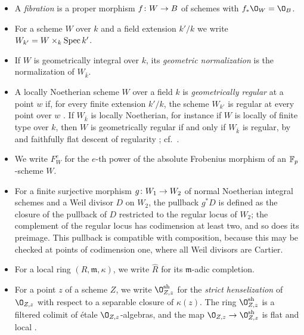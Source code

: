 \begin{itemize}
\item A \emph{fibration} is a proper morphism $f\colon W\to B$ of schemes with $f_*\O_W = \O_B$.
\item For a scheme $W$ over $k$ and a field extension $k'/k$ we write $W_{k'} = W\times_k\operatorname{Spec} k'$.
\item If $W$ is geometrically integral over $k$, its \emph{geometric normalization} is the normalization of $W_{\bar k}$.
\item A locally Noetherian scheme $W$ over a field $k$ is \emph{geometrically regular} at a point $w$ if, for every finite extension $k'/k$, the scheme $W_{k'}$ is regular at every point over $w$ \cite[D\'efinition~6.7.6]{EGA}.
  If $W_{\bar k}$ is locally Noetherian, for instance if $W$ is locally of finite type over $k$, then $W$ is geometrically regular if and only if $W_{\bar k}$ is regular, by \cite[Proposition~5.13.7]{EGA} and faithfully flat descent of regularity \cite[Tag~]{Stacks}; cf.\ \cite[Proposition~6.7.7]{EGA}.
\item We write $F^e_W$ for the $e$-th power of the absolute Frobenius morphism of an $\mathbb{F}_p$-scheme $W$.
\item For a finite surjective morphism $g\colon W_1\to W_2$ of normal Noetherian integral schemes and a Weil divisor $D$ on $W_2$, the pullback $g^*D$ is defined as the closure of the pullback of $D$ restricted to the regular locus of $W_2$; the complement of the regular locus has codimension at least two, and so does its preimage.
This pullback is compatible with composition, because this may be checked at points of codimension one, where all Weil divisors are Cartier.
\item For a local ring $(R,\mathfrak m,\kappa)$, we write $\widehat R$ for its $\mathfrak m$-adic completion.
\item
  For a point $z$ of a scheme $Z$, we write $\O^{\rm sh}_{Z,z}$ for the \emph{strict henselization} of $\O_{Z,z}$ with respect to a separable closure of $\kappa(z)$.
  The ring $\O^{\rm sh}_{Z,z}$ is a filtered colimit of \'etale $\O_{Z,z}$-algebras, and the map $\O_{Z,z}\to\O^{\rm sh}_{Z,z}$ is flat and local \cite[Tag~]{Stacks}.
\end{itemize}

